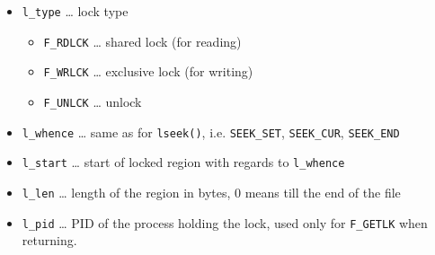 \begin{slide}
\begin{itemize}
\item \texttt{l\_type} \dots{} lock type
    \begin{itemize}
    \item \texttt{F\_RDLCK} \dots{} shared lock (for reading)
    \item \texttt{F\_WRLCK} \dots{} exclusive lock (for writing)
    \item \texttt{F\_UNLCK} \dots{} unlock
    \end{itemize}
\item \texttt{l\_whence} \dots{} same as for \texttt{lseek()}, i.e.
\texttt{SEEK\_SET},
\texttt{SEEK\_CUR}, \texttt{SEEK\_END}
\item \texttt{l\_start} \dots{} start of locked region with regards to
\texttt{l\_whence}
\item \texttt{l\_len} \dots{} length of the region in bytes, 0 means till the
end of the file
\item \texttt{l\_pid} \dots{} PID of the process holding the lock, used
only for \texttt{F\_GETLK} when returning.
\end{itemize}
\end{slide}

